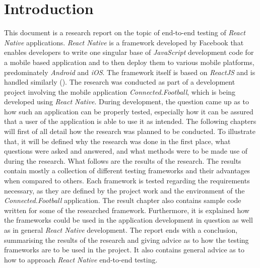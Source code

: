 \section{Introduction}
\label{sec:introduction}

This document is a research report on the topic of end-to-end testing of \textit{React Native} applications. \textit{React Native} is a framework developed by Facebook that enables developers to write one singular base of \textit{JavaScript} development code for a mobile based application and to then deploy them to various mobile platforms, predominately \textit{Android} and \textit{iOS}. The framework itself is based on \textit{ReactJS} and is handled similarly (\cite{react-native}).
\newline
The research was conducted as part of a development project involving the mobile application \textit{Connected.Football}, which is being developed using \textit{React Native}. During development, the question came up as to how such an application can be properly tested, especially how it can be assured that a user of the application is able to use it as intended.
\newline
The following chapters will first of all detail how the research was planned to be conducted. To illustrate that, it will be defined why the research was done in the first place, what questions were asked and answered, and what methods were to be made use of during the research.
\newline
What follows are the results of the research. The results contain mostly a collection of different testing frameworks and their advantages when compared to others. Each framework is tested regarding the requirements necessary, as they are defined by the project work and the environment of the \textit{Connected.Football} application. The result chapter also contains sample code written for some of the researched framework. Furthermore, it is explained how the frameworks could be used in the application development in question as well as in general \textit{React Native} development.
\newline
The report ends with a conclusion, summarising the results of the research and giving advice as to how the testing frameworks are to be used in the project. It also contains general advice as to how to approach \textit{React Native} end-to-end testing.